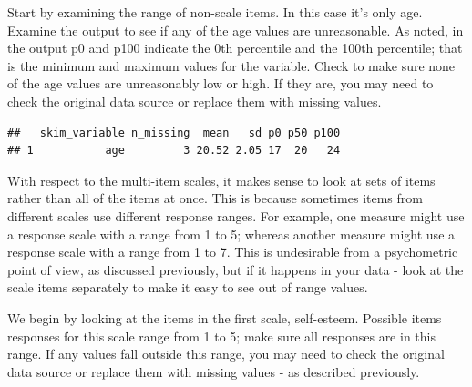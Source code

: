 \documentclass[
]{krantz}
\makeatletter
\newenvironment{Shaded}{\begin{snugshade}}{\end{snugshade}}
\newcommand{\KeywordTok}[1]{\textcolor[rgb]{0.27,0.27,0.27}{\textbf{#1}}}
\newcommand{\NormalTok}[1]{#1}
\newcommand{\OperatorTok}[1]{\textcolor[rgb]{0.43,0.43,0.43}{\textbf{#1}}}
\newcommand{\StringTok}[1]{\textcolor[rgb]{0.5,0.5,0.5}{#1}}
\newenvironment{kframe}{%
\medskip{}
\setlength{\fboxsep}{.8em}
 \def\at@end@of@kframe{}%
 \ifinner\ifhmode%
  \def\at@end@of@kframe{\end{minipage}}%
  \begin{minipage}{\columnwidth}%
 \fi\fi%
 \def\FrameCommand##1{\hskip\@totalleftmargin \hskip-\fboxsep
 \colorbox{shadecolor}{##1}\hskip-\fboxsep
     \hskip-\linewidth \hskip-\@totalleftmargin \hskip\columnwidth}%
 \MakeFramed {\advance\hsize-\width
   \@totalleftmargin\z@ \linewidth\hsize
   \@setminipage}}%
 {\par\unskip\endMakeFramed%
 \at@end@of@kframe}
\renewenvironment{Shaded}{\begin{kframe}}{\end{kframe}}
\makeatother
\begin{document}
Start by examining the range of non-scale items. In this case it's only age. Examine the output to see if any of the age values are unreasonable. As noted, in the output p0 and p100 indicate the 0th percentile and the 100th percentile; that is the minimum and maximum values for the variable. Check to make sure none of the age values are unreasonably low or high. If they are, you may need to check the original data source or replace them with missing values.

\begin{Shaded}
\end{Shaded}

\begin{verbatim}
##   skim_variable n_missing  mean   sd p0 p50 p100
## 1           age         3 20.52 2.05 17  20   24
\end{verbatim}

With respect to the multi-item scales, it makes sense to look at sets of items rather than all of the items at once. This is because sometimes items from different scales use different response ranges. For example, one measure might use a response scale with a range from 1 to 5; whereas another measure might use a response scale with a range from 1 to 7. This is undesirable from a psychometric point of view, as discussed previously, but if it happens in your data - look at the scale items separately to make it easy to see out of range values.

We begin by looking at the items in the first scale, self-esteem. Possible items responses for this scale range from 1 to 5; make sure all responses are in this range. If any values fall outside this range, you may need to check the original data source or replace them with missing values - as described previously.

\begin{Shaded}
\end{Shaded}
\end{document}
